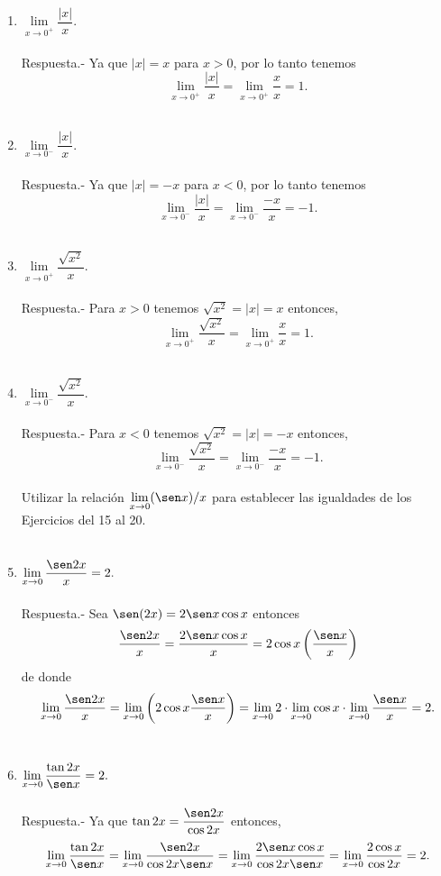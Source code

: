 \begin{enumerate}[\bfseries 1.]
    \item $\lim\limits_{x\to 0^+}\dfrac{|x|}{x}.$\\\\
	Respuesta.-\; Ya que $|x|=x$ para $x>0$, por lo tanto tenemos  
	$$\lim_{x\to 0^+}\dfrac{|x|}{x}=\lim_{x\to 0^+}\dfrac{x}{x}=1.$$\\

    \item $\lim\limits_{x\to 0^-}\dfrac{|x|}{x}.$\\\\
	Respuesta.-\; Ya que $|x|=-x$ para $x<0$, por lo tanto tenemos  
	$$\lim_{x\to 0^-}\dfrac{|x|}{x}=\lim_{x\to 0^-}\dfrac{-x}{x}=-1.$$\\

    \item $\lim\limits_{x\to 0^+}\dfrac{\sqrt{x^2}}{x}.$\\\\
	Respuesta.-\; Para $x>0$ tenemos $\sqrt{x^2}=|x|=x$ entonces,
	$$\lim_{x\to 0^+}\dfrac{\sqrt{x^2}}{x}=\lim_{x\to 0^+} \dfrac{x}{x}=1.$$\\

    \item $\lim\limits_{x\to 0^-}\dfrac{\sqrt{x^2}}{x}.$\\\\
	Respuesta.-\; Para $x<0$ tenemos $\sqrt{x^2}=|x|=-x$ entonces,
	$$\lim_{x\to 0^-}\dfrac{\sqrt{x^2}}{x}=\lim_{x\to 0^-} \dfrac{-x}{x}=-1.$$\\

	Utilizar la relación $\lim\limits_{x\to 0}(\sen x)/x$ para establecer las igualdades de los Ejercicios del 15 al 20.\\\\

    \item $\lim\limits_{x\to 0}\dfrac{\sen 2x}{x}=2.$\\\\
	Respuesta.-\; Sea $\sen(2x) = 2\sen x \cos x$ entonces 
	$$\dfrac{\sen 2x}{x} = \dfrac{2\sen x \cos x}{x} = 2\cos x\left(\dfrac{\sen x}{x}\right)$$
	de donde 
	$$\lim_{x\to 0}\dfrac{\sen 2x}{x}=\lim_{x\to 0}\left(2\cos x \dfrac{\sen x}{x}\right) = \lim_{x\to 0}2\cdot \lim_{x\to 0}\cos x \cdot \lim_{x\to 0}\dfrac{\sen x}{x} = 2.$$\\

    \item $\lim\limits_{x\to 0}\dfrac{\tan 2x}{\sen x}=2.$\\\\
	Respuesta.-\; Ya que $\tan2x = \dfrac{\sen 2x}{\cos 2x}$ entonces,
	$$\lim_{x\to 0}\dfrac{\tan 2x}{\sen x} = \lim_{x\to 0} \dfrac{\sen 2x}{\cos 2x \sen x} = \lim_{x\to 0} \dfrac{2\sen x \cos x}{\cos 2x \sen x}=\lim_{x\to 0} \dfrac{2\cos x}{\cos 2x}=2.$$\\


\end{enumerate}
